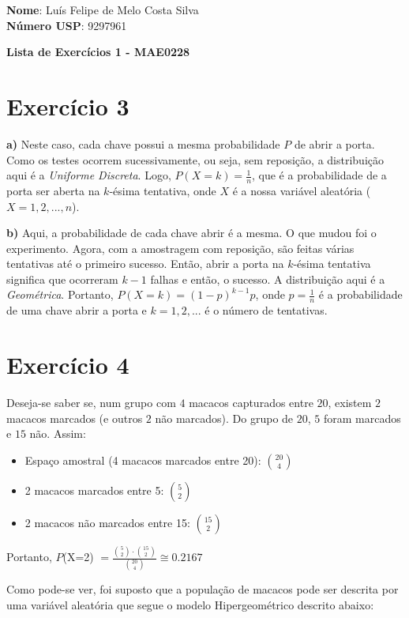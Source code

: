 \documentclass[12pt,letterpaper]{article}
\begin{document}
	
	\textbf{Nome}: Luís Felipe de Melo Costa Silva \\
	\textbf{Número USP}: 9297961 
	
	\begin{center}
		\LARGE \bf
		Lista de Exercícios 1 - MAE0228
	\end{center}
	
	\section*{Exercício 3}
	
	\textbf{a)} Neste caso, cada chave possui a mesma probabilidade $P$ de abrir a porta. Como os testes ocorrem sucessivamente, ou seja, sem reposição, a distribuição aqui é a \textit{Uniforme Discreta}. Logo, $P(X=k) = \frac{1}{n}$, que é a probabilidade de a porta ser aberta na $k$-ésima tentativa, onde $X$ é a nossa variável aleatória ($X = 1, 2, ..., n$). 
	
	\textbf{b)} Aqui, a probabilidade de cada chave abrir é a mesma. O que mudou foi o experimento. Agora, com a amostragem com reposição, são feitas várias tentativas até o primeiro sucesso. Então, abrir a porta na $k$-ésima tentativa significa que ocorreram $k-1$ falhas e então, o sucesso. A distribuição aqui é a \textit{Geométrica}. Portanto, $P(X=k) = (1-p)^{k-1}p$, onde $p = \frac{1}{n}$ é a probabilidade de uma chave abrir a porta e $k = 1, 2, ...$ é o número de tentativas.
	
	\section*{Exercício 4}
	
	Deseja-se saber se, num grupo com $4$ macacos capturados entre $20$, existem $2$ macacos marcados (e outros $2$ não marcados). Do grupo de $20$, $5$ foram marcados e $15$ não. Assim:
	
	\begin{itemize}
		\item Espaço amostral (4 macacos marcados entre 20): $\binom{20}{4}$
		\item 2 macacos marcados entre 5: $\binom{5}{2}$
		\item 2 macacos não marcados entre 15: $\binom{15}{2}$
	\end{itemize}
	
	Portanto, $P$(X=2) $= \frac{\binom{5}{2} \cdot \binom{15}{2}}{\binom{20}{4}} \cong 0.2167$
	
	Como pode-se ver, foi suposto que a população de macacos pode ser descrita por uma variável aleatória que segue o modelo Hipergeométrico descrito abaixo:
	
\end{document}
